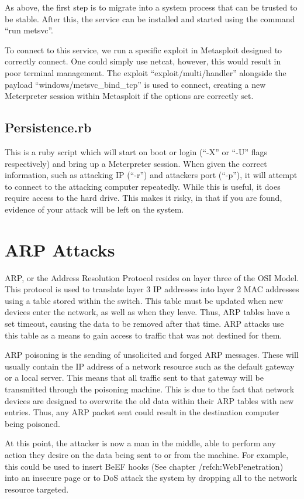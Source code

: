 \documentclass[a4paper,11pt]{report}
\begin{document}
			As above, the first step is to migrate into a system process that can be trusted to be stable. 
			After this, the service can be installed and started using the command ``run metsvc''. 

			To connect to this service, we run a specific exploit in Metasploit designed to correctly connect. 
			One could simply use netcat, however, this would result in poor terminal management. 
			The exploit ``exploit/multi/handler'' alongside the payload ``windows/metsvc\_bind\_tcp'' is used to connect, creating a new Meterpreter session within Metasploit if the options are correctly set. 
			
		\subsection{Persistence.rb}
			This is a ruby script which will start on boot or login (``-X'' or ``-U'' flags respectively) and bring up a Meterpreter session. 
			When given the correct information, such as attacking IP (``-r'') and attackers port (``-p''), it will attempt to connect to the attacking computer repeatedly. 
			While this is useful, it does require access to the hard drive. 
			This makes it risky, in that if you are found, evidence of your attack will be left on the system. 
	\section{ARP Attacks}
		ARP, or the Address Resolution Protocol resides on layer three of the OSI Model. 
		This protocol is used to translate layer 3 IP addresses into layer 2 MAC addresses using a table stored within the switch. 
		This table must be updated when new devices enter the network, as well as when they leave. 
		Thus, ARP tables have a set timeout, causing the data to be removed after that time. 
		ARP attacks use this table as a means to gain access to traffic that was not destined for them. 

		ARP poisoning is the sending of unsolicited and forged ARP messages. 
		These will usually contain the IP address of a network resource such as the default gateway or a local server. 
		This means that all traffic sent to that gateway will be transmitted through the poisoning machine. 
		This is due to the fact that network devices are designed to overwrite the old data within their ARP tables with new entries. 
		Thus, any ARP packet sent could result in the destination computer being poisoned. 

		At this point, the attacker is now a man in the middle, able to perform any action they desire on the data being sent to or from the machine. 
		For example, this could be used to insert BeEF hooks (See chapter /ref{ch:WebPenetration}) into an insecure page or to DoS attack the system by dropping all to the network resource targeted. 
\end{document}
